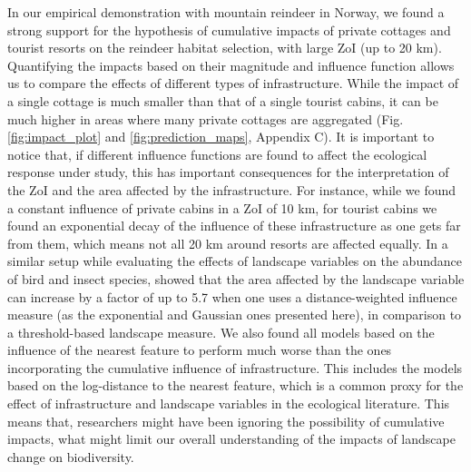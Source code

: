 \documentclass[titlepage]{article}
\begin{document}
In our empirical demonstration with mountain reindeer in Norway, we found a strong support for the hypothesis of cumulative impacts of private cottages and tourist resorts on the reindeer habitat selection, with large ZoI (up to 20 km). Quantifying the impacts based on their magnitude and influence function allows us to compare the effects of different types of infrastructure. While the impact of a single cottage is much smaller than that of a single tourist cabins, it can be much higher in areas where many private cottages are aggregated (Fig. \ref{fig:impact_plot} and \ref{fig:prediction_maps}, Appendix C). It is important to notice that, if different influence functions are found to affect the ecological response under study, this has important consequences for the interpretation of the ZoI and the area affected by the infrastructure. For instance, while we found a constant influence of private cabins in a ZoI of 10 km, for tourist cabins we found an exponential decay of the influence of these infrastructure as one gets far from them, which means not all 20 km around resorts are affected equally. In a similar setup while evaluating the effects of landscape variables on the abundance of bird and insect species, \citet{miguet_how_2017} showed that the area affected by the landscape variable can increase by a factor of up to 5.7 when one uses a distance-weighted influence measure (as the exponential and Gaussian ones presented here), in comparison to a threshold-based landscape measure. 
We also found all models based on the influence of the nearest feature to perform much worse than the ones incorporating the cumulative influence of infrastructure. This includes the models based on the log-distance to the nearest feature, which is a common proxy for the effect of infrastructure and landscape variables in the ecological literature. This means that, researchers might have been ignoring 
the possibility of cumulative impacts, what might limit our overall understanding of the impacts of landscape change on biodiversity.
\end{document}

